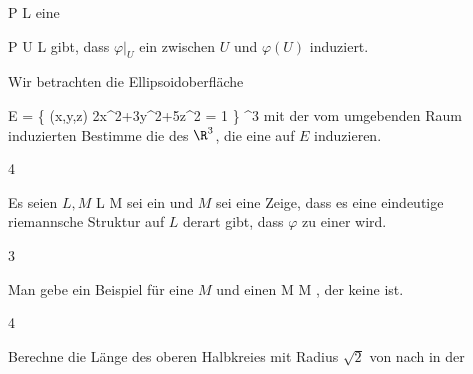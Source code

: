\mavergleichskette
{\vergleichskette
{ P
}
{ \in }{ L
}
{  }{
}
{    }{
}
{   }{
}
}
{}{}{}
eine

\mavergleichskette
{\vergleichskette
{ P
}
{ \in }{ U
}
{ \subseteq }{ L
}
{    }{
}
{   }{
}
}
{}{}{}
gibt, dass $\varphi  \vert_U$ ein
zwischen $U$ und $\varphi(U)$ induziert.


{}
{

Wir betrachten die Ellipsoidoberfläche

\mavergleichskettedisp
{\vergleichskette
{ E
}
{ =} { \left\{ (x,y,z)  \mid   2x^2+3y^2+5z^2 = 1        \right\}
}
{ \subset} { \R^3
}
{ } {
}
{ } {
}
}
{}{}{}
mit der vom umgebenden Raum induzierten
Bestimme die
des $\R^3$, die eine
auf $E$ induzieren.

}
{} {}

{4}
{

Es seien $L,M$
\maabbdisp {\varphi} { L } { M
} {}
sei ein
und $M$ sei eine
Zeige, dass es eine eindeutige riemannsche Struktur auf $L$ derart gibt, dass $\varphi$ zu einer
wird.

}
{} {}

{3}
{

Man gebe ein Beispiel für eine
$M$ und einen
\maabbdisp {\varphi} { M } { M
} {,}
der keine
ist.

}
{} {}

{4}
{

Berechne die Länge des oberen Halbkreies mit Radius $\sqrt{2}$ von
 nach
 in der

}
{} {}

